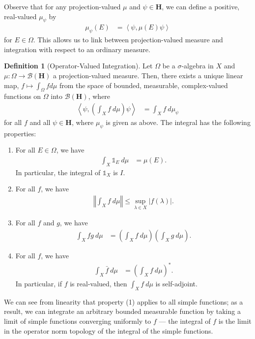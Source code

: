 \documentclass[10pt]{extarticle}
\newcommand{\iprod}[2]{\left\langle #1,#2\right\rangle}
\newcommand{\norm}[1]{\left\Vert #1\right\Vert}
\theoremstyle{plain}
\theoremstyle{definition}
\newtheorem*{definition}{Definition}
\theoremstyle{remark}
\renewcommand{\newline}{\hfill\break}
\begin{document}
  Observe that for any projection-valued $\mu$ and $\psi\in \mathbf{H}$, we can define a positive, real-valued $\mu_{\psi}$ by
  \begin{align*}
    \mu_{\psi}(E) &= \iprod{\psi}{\mu(E)\psi}
  \end{align*}
  for $E\in \Omega$. This allows us to link between projection-valued measure and integration with respect to an ordinary measure.
  \begin{definition}[Operator-Valued Integration]
    Let $\Omega$ be a $\sigma$-algebra in $X$ and $\mu: \Omega \rightarrow \mathcal{B}\left(\mathbf{H}\right)$ a projection-valued measure. Then, there exists a unique linear map, $f \mapsto \int_{\Omega}fd\mu$ from the space of bounded, measurable, complex-valued functions on $\Omega$ into $\mathcal{B}(\mathbf{H})$, where
    \begin{align*}
      \iprod{\psi}{\left(\int_{X}f\:d\mu\right)\psi} &= \int_{X}f \:d\mu_{\psi}
    \end{align*}
    for all $f$ and all $\psi \in \mathbf{H}$, where $\mu_{\psi}$ is given as above. The integral has the following properties:
    \begin{enumerate}[(1)]
      \item For all $E\in \Omega$, we have
        \begin{align*}
          \int_{X}^{} \mathbb{1}_{E} \:d\mu &= \mu(E).
        \end{align*}
        In particular, the integral of $\mathbb{1}_{X}$ is $I$.
      \item For all $f$, we have
        \begin{align*}
          \norm{\int_{X}f\:d\mu} \leq \sup_{\lambda \in X}|f(\lambda)|.
        \end{align*}
      \item For all $f$ and $g$, we have
        \begin{align*}
          \int_{X}fg\:d\mu &= \left(\int_{X}f\:d\mu\right) \left(\int_{X}^{} g \:d\mu\right).
        \end{align*}
      \item For all $f$, we have
        \begin{align*}
          \int_{X}^{} \bar{f} \:d\mu &= \left(\int_{X}^{} f \:d\mu\right)^{\ast}.
        \end{align*}
        In particular, if $f$ is real-valued, then $\int_{X}f\:d\mu$ is self-adjoint.
    \end{enumerate}
  \end{definition}
  We can see from linearity that property (1) applies to all simple functions; as a result, we can integrate an arbitrary bounded measurable function by taking a limit of simple functions converging uniformly to $f$ --- the integral of $f$ is the limit in the operator norm topology of the integral of the simple functions.\newline
\end{document}
